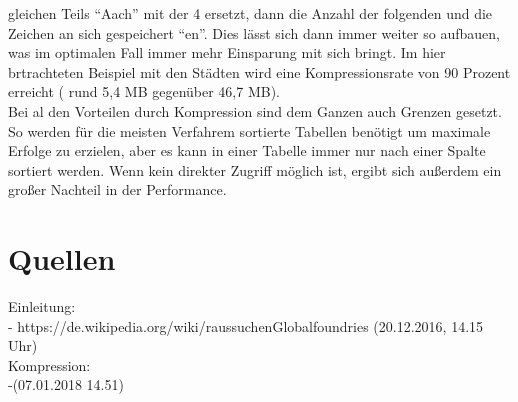 \documentclass[a4paper, 12pt]{scrartcl}
\begin{document}
gleichen Teils "`Aach"' mit der 4 ersetzt, dann die Anzahl der folgenden und die Zeichen an sich gespeichert "`en"'. Dies lässt sich dann immer weiter so aufbauen, was im optimalen Fall immer mehr Einsparung mit sich bringt. Im hier brtrachteten Beispiel mit den Städten wird eine Kompressionsrate von 90 Prozent erreicht ( rund 5,4 MB gegenüber 46,7 MB). \\ Bei al den Vorteilen durch Kompression sind dem Ganzen auch Grenzen gesetzt. So werden für die meisten Verfahrem sortierte Tabellen benötigt um maximale Erfolge zu erzielen, aber es kann in einer Tabelle immer nur nach einer Spalte sortiert werden. Wenn kein direkter Zugriff möglich ist, ergibt sich außerdem ein großer Nachteil in der Performance.
\newpage
\section{Quellen}
Einleitung: \\
	- https://de.wikipedia.org/wiki/raussuchenGlobalfoundries (20.12.2016, 14.15 Uhr) \\
Kompression: \\
	-(07.01.2018 14.51) \\
	
	
\end{document}
